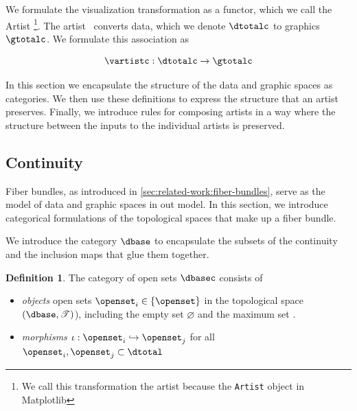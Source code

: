 \documentclass[10pt,journal,compsoc]{IEEEtran}
\theoremstyle{definition}
\newtheorem{definition}{Definition}[section]
\theoremstyle{remark}
\begin{document}
We formulate the visualization transformation as a functor, which we call the \textcolor{artist}{Artist} \vartist \footnote{We call this transformation the artist because the \texttt{Artist} object in Matplotlib\cite{hunterMatplotlib2DGraphics2007}}. The artist \vartist\ converts \textcolor{total}{data}, which we denote $\mathcal{\dtotalc}$ to \textcolor{total}{graphics} $\mathcal{\gtotalc}$. We formulate this association as 

\begin{equation}
  \label{eq:artist:artist}
  \vartistc: \mathcal{\dtotalc} \rightarrow \mathcal{\gtotalc}
\end{equation}

In this section we encapsulate the structure of the data and graphic spaces as categories. We then use these definitions to express the structure that an artist preserves. Finally, we introduce rules for composing artists in a way where the structure between the inputs to the individual artists is preserved. 


\subsection{Continuity}
\label{sec:artist:category}

Fiber bundles, as introduced in \autoref{sec:related-work:fiber-bundles}, serve as the model of data and graphic spaces in out model. In this section, we introduce categorical formulations of the topological spaces that make up a fiber bundle. 

We introduce the category $\mathcal{\dbase}$ to encapsulate the subsets of the continuity and the inclusion maps that glue them together. 

\begin{definition} \label{def:category:K} The category of open sets $\mathcal{\dbasec}$ consists of
  \begin{itemize}
    \item \textit{objects} open sets $\openset_{i} \in \{\openset\}$ in the topological space $(\dbase, \mathscr{T})$), including the empty set $\varnothing$ and the maximum set \dbase. 
    \item \textit{morphisms} $\iota: \openset_{i} \hookrightarrow \openset_{j}$ for all  $\openset_i, \openset_j \subset \dtotal$
  \end{itemize} 
\end{definition}
\end{document}
